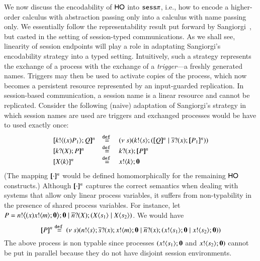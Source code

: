We now discuss the encodability of  $\mathsf{HO}$ into $\mathtt{sess}\pi$, 
i.e., how to encode a higher-order calculus with abstraction passing only
into a calculus with name passing only. 
We essentially follow the representability result put forward by 
Sangiorgi~\cite{San92,SaWabook}, but casted in the setting of session-typed communications. 
As we shall see, linearity of session endpoints will play a role in adaptating Sangiorgi's 
encodability strategy into a typed setting. 
Intuitively, such a strategy represents the exchange of a process with the exchange of 
a \emph{trigger}---a freshly generated names. 
Triggers may then be used to activate copies of the process, which now becomes a persistent 
resource represented by an input-guarded replication. In session-based communication, a session name 
is a linear resource and cannot be replicated. Consider the following (naive) adaptation of 
Sangiorgi's strategy in which session names are used are triggers and exchanged processes would be have to used exactly once:
\[
	\begin{array}{lcl}
		\pmap{\bout{k}{\abs{x} P_1} Q}{n} & \defeq &  \newsp{s}{\bout{k}{s} (\pmap{Q}{n} \Par \binp{\dual{s}}{x} \pmap{P_1}{n})} \\
		\pmap{\binp{k}{X} P}{n} & \defeq& \binp{k}{x} \pmap{P}{n}\\
		\pmap{\appl{X}{k}}{n} & \defeq & \bout{x}{k} \inact
	\end{array}
	\]
%
%
(The mapping $[\!\![\cdot]\!\!]^n$ would be defined homomorphically for the remaining $\mathsf{HO}$ constructs.)
Although $[\!\![\cdot]\!\!]^n$ captures the correct semantics when
dealing with systems that allow only linear process variables,
it suffers from non-typability in the presence
of shared process variables. For instance,
let $P = n ! \big\langle (x)x ! \langle m \rangle ;\mathbf{0} \big\rangle ; \mathbf{0} \;|\; \overline{n} ? (X) ; (X\langle s_1 \rangle \;|\; X\langle s_2 \rangle)$.
We would have
\[
	[\!\![P]\!\!]^n \stackrel{\mathtt{def}\ }{=}
	(\nu\ s)(n ! \langle s \rangle ; \overline{s} ? (x) ; x ! \langle m \rangle ; \mathbf{0} \;|\; \overline{n} ? (x) ; (x ! \langle s_1 \rangle ; \mathbf{0} \;|\; x ! \langle s_2 \rangle ; \mathbf{0}))
\]
The above process is non typable since processes $(x ! \langle s_1 \rangle ; \mathbf{0}$ and $x ! \langle s_2 \rangle ; \mathbf{0})$
cannot be put in parallel because they do not have disjoint session environments.

